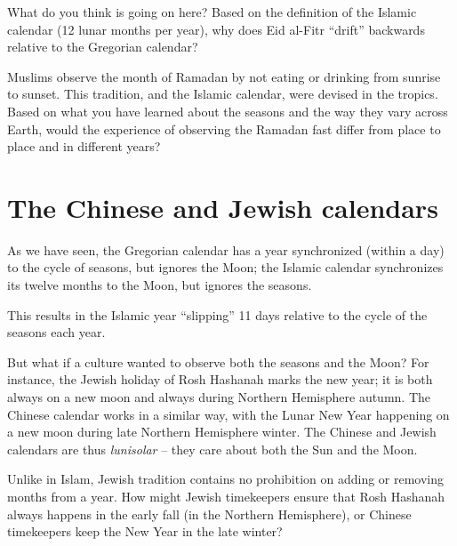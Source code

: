\documentclass[11pt]{article}
\begin{document}
\normalsize

\newpage

What do you think is going on here? Based on the definition of the Islamic calendar (12 lunar months per year), why does Eid al-Fitr ``drift'' backwards relative to the Gregorian calendar?

\vspace{1.6in}
\underline{\hspace{6in}}


Muslims observe the month of Ramadan by not eating or drinking from sunrise to sunset. This tradition, and the Islamic calendar, were devised in the tropics. Based on what you have learned about the seasons and the way they vary across Earth, would the experience of observing the Ramadan fast differ from place to place and in different years?


\vspace{2in}
\underline{\hspace{6in}}

\section{The Chinese and Jewish calendars}

As we have seen, the Gregorian calendar has a year synchronized (within a day) to the cycle of seasons, but ignores the Moon; the Islamic calendar synchronizes its twelve months to the Moon, but ignores the seasons. 

This results in the Islamic year ``slipping'' 11 days relative to the cycle of the seasons each year.

But what if a culture wanted to observe both the seasons and the Moon? For instance, the Jewish holiday of Rosh Hashanah marks the new year; it is both always on a new moon and always during Northern Hemisphere autumn. The Chinese calendar works in a similar way, with the Lunar New Year happening on a new moon during late Northern Hemisphere winter. The Chinese and Jewish calendars are thus {\it lunisolar} -- they care about both the Sun and the Moon.

\newpage
Unlike in Islam, Jewish tradition contains no prohibition on adding or removing months from a year. How might Jewish timekeepers ensure that Rosh Hashanah always happens in the early fall (in the Northern Hemisphere), or Chinese timekeepers keep the New Year in the late winter?

\vspace{2in}
\underline{\hspace{6in}}
\end{document}
